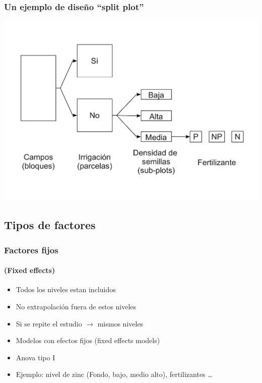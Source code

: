 \documentclass[gray,handout,mathserif]{beamer}
\begin{document}
 
\begin{frame}[label=splitploteg]
   \frametitle{Un ejemplo de dise\~no ``split plot''}
   \includegraphics[scale=0.35]{figs/splitplot.pdf}
\end{frame}%


\subsection[Tipos de factores]{Tipos de factores}

\begin{frame}[label=encours]
   \frametitle{Factores fijos}
   \framesubtitle{(Fixed effects)}
   \begin{itemize}
      \item Todos los niveles estan incluidos
      \item No extrapolaci\'on fuera de estos niveles
      \item Si se repite el estudio $\rightarrow$ mismos niveles
      \item Modelos con efectos fijos (fixed effects models)
      \item Anova tipo I
      \item Ejemplo: nivel de zinc (Fondo, bajo, medio alto), fertilizantes \ldots
   \end{itemize}
\end{frame}%
\end{document}
